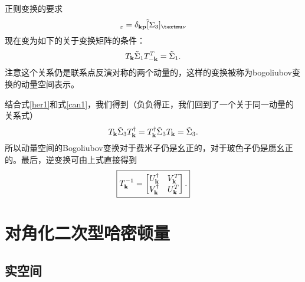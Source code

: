 正则变换的要求
\begin{equation}
  [\beta_{\vb k\mu},\beta_{\vb p,\nu}^\dagger]_\varepsilon = \delta_{\vb k\vb p}\tilde [\Sigma_3]_{\mu\nu}
\end{equation}
现在变为如下的关于变换矩阵的条件：
\begin{equation}
  T_{\vb k}\tilde \Sigma_1 T^T_{-\vb k}=\tilde \Sigma_1.\label{can1}
\end{equation}
注意这个关系仍是联系点反演对称的两个动量的，这样的变换被称为bogoliubov变换的动量空间表示。

结合式\eqref{her1}和式\eqref{can1}，我们得到（负负得正，我们回到了一个关于同一动量的关系式）
\begin{equation}
  T_{\vb k}\tilde \Sigma_3 T_{\vb k}^\dagger = T_{\vb k}^\dagger \tilde \Sigma_3 T_{\vb k} = \tilde \Sigma_3.\label{tkpu}
\end{equation}
所以动量空间的Bogoliubov变换对于费米子仍是幺正的，对于玻色子仍是赝幺正的。最后，逆变换可由上式直接得到
\begin{equation}
  \boxed{
  T^{-1}_{\vb k}=\begin{bmatrix}
      U^\dagger_{\vb k} & V^T_{\vb k}\\
      V^\dagger_{\vb k} & U^T_{\vb k}
  \end{bmatrix}.}
\end{equation}

\section{对角化二次型哈密顿量}

\subsection{实空间}

